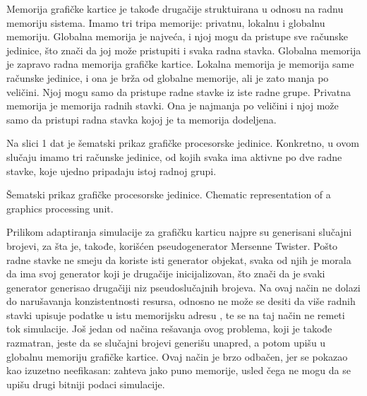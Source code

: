 Memorija grafičke kartice je takođe drugačije struktuirana u odnosu na radnu memoriju sistema. Imamo tri tripa memorije: privatnu, lokalnu i globalnu memoriju. Globalna memorija je najveća, i njoj mogu da pristupe sve računske jedinice, što znači da joj može pristupiti i svaka radna stavka. Globalna memorija je zapravo radna memorija grafičke kartice. Lokalna memorija je memorija same računske jedinice, i ona je brža od globalne memorije, ali je zato manja po veličini. Njoj mogu samo da pristupe radne stavke iz iste radne grupe. Privatna memorija je memorija radnih stavki. Ona je najmanja po veličini i njoj može samo da pristupi radna stavka kojoj je ta memorija dodeljena.

Na slici 1 dat je šematski prikaz grafičke procesorske jedinice. Konkretno, u ovom slučaju imamo tri računske jedinice, od kojih svaka ima aktivne po dve radne stavke, koje ujedno pripadaju istoj radnoj grupi.

    {Šematski prikaz grafičke procesorske jedinice.}
    {Chematic representation of a graphics processing unit.}

    Prilikom adaptiranja simulacije za grafičku karticu najpre su generisani slučajni brojevi, za šta je, takođe, korišćen pseudogenerator Mersenne Twister. Pošto radne stavke ne smeju da koriste isti generator objekat, svaka od njih je morala da ima svoj generator koji je drugačije inicijalizovan, što znači da je svaki generator generisao drugačiji niz pseudoslučajnih brojeva. Na ovaj način ne dolazi do narušavanja konzistentnosti resursa, odnosno ne može se desiti da više radnih stavki upisuje podatke u istu memorijsku adresu \parencite{feautrier2011}, te se na taj način ne remeti tok simulacije. Još jedan od načina rešavanja ovog problema, koji je takođe razmatran, jeste da se slučajni brojevi generišu unapred, a potom upišu u globalnu memoriju grafičke kartice. Ovaj način je brzo odbačen, jer se pokazao kao izuzetno neefikasan: zahteva jako puno memorije, usled čega ne mogu da se upišu drugi bitniji podaci simulacije.


